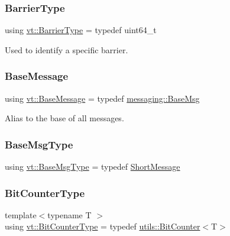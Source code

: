 \mbox{\label{namespacevt_a25e481f0d6bbc7204db23d1c87a62e77}} 
\subsubsection{\texorpdfstring{Barrier\+Type}{BarrierType}}
{\footnotesize\ttfamily using \hyperlink{namespacevt_a25e481f0d6bbc7204db23d1c87a62e77}{vt\+::\+Barrier\+Type} = typedef uint64\+\_\+t}



Used to identify a specific barrier. 

\mbox{\label{namespacevt_ac34f95a5e2b8109b55bfba52b074443d}} 
\subsubsection{\texorpdfstring{Base\+Message}{BaseMessage}}
{\footnotesize\ttfamily using \hyperlink{namespacevt_ac34f95a5e2b8109b55bfba52b074443d}{vt\+::\+Base\+Message} = typedef \hyperlink{structvt_1_1messaging_1_1_base_msg}{messaging\+::\+Base\+Msg}}



Alias to the base of all messages. 

\mbox{\label{namespacevt_a44d0d4e144748f2b19a1cfd962f50338}} 
\subsubsection{\texorpdfstring{Base\+Msg\+Type}{BaseMsgType}}
{\footnotesize\ttfamily using \hyperlink{namespacevt_a44d0d4e144748f2b19a1cfd962f50338}{vt\+::\+Base\+Msg\+Type} = typedef \hyperlink{namespacevt_a1125ac1da6c0bbf141e0ea0739d7602d}{Short\+Message}}

\mbox{\label{namespacevt_a34b3eb2eea8db3cf4ae27ced35b19b46}} 
\subsubsection{\texorpdfstring{Bit\+Counter\+Type}{BitCounterType}}
{\footnotesize\ttfamily template$<$typename T $>$ \\
using \hyperlink{namespacevt_a34b3eb2eea8db3cf4ae27ced35b19b46}{vt\+::\+Bit\+Counter\+Type} = typedef \hyperlink{structvt_1_1utils_1_1_bit_counter}{utils\+::\+Bit\+Counter}$<$T$>$}


